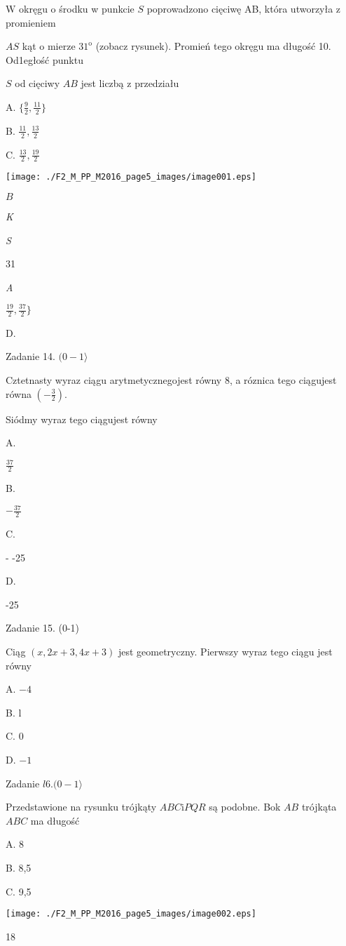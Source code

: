 \documentclass[a4paper,12pt]{article}
\begin{document}
$\mathrm{W}$ okręgu o środku w punkcie $S$ poprowadzono cięciwę AB, która utworzyła z promieniem

$AS$ kąt o mierze $31^{\mathrm{o}}$ (zobacz rysunek). Promień tego okręgu ma długość 10. Od1egłość punktu

$S$ od cięciwy $AB$ jest liczbą z przedziału

A. $\displaystyle \{\frac{9}{2},\frac{11}{2}\}$

B. $\displaystyle \frac{11}{2}, \displaystyle \frac{13}{2}$

C. $\displaystyle \frac{13}{2}, \displaystyle \frac{19}{2}$
\begin{center}
\texttt{[image: ./F2\_M\_PP\_M2016\_page5\_images/image001.eps]}
\end{center}
$B$

{\it K}

{\it S}

31

{\it A}

$\displaystyle \frac{19}{2}, \displaystyle \frac{37}{2}\}$

D.

Zadanie 14. $(0-1\rangle$

Cztetnasty wyraz ciągu arytmetycznegojest równy 8, a róznica tego ciągujest równa $(-\displaystyle \frac{3}{2}).$

Siódmy wyraz tego ciągujest równy

A.

$\displaystyle \frac{37}{2}$

B.

$-\displaystyle \frac{37}{2}$

C.

- -25

D.

-25

Zadanie 15. (0-1)

Ciąg $(x,2x+3,4x+3)$ jest geometryczny. Pierwszy wyraz tego ciągu jest równy

A. $-4$

B. l

C. 0

D. $-1$

Zadanie $l6. (0-1\rangle$

Przedstawione na rysunku trójkąty $ABC\mathrm{i}PQR$ są podobne. Bok $AB$ trójkąta $ABC$ ma długość

A. 8

B. 8,5

C. 9,5
\begin{center}
\texttt{[image: ./F2\_M\_PP\_M2016\_page5\_images/image002.eps]}
\end{center}
18
\end{document}
